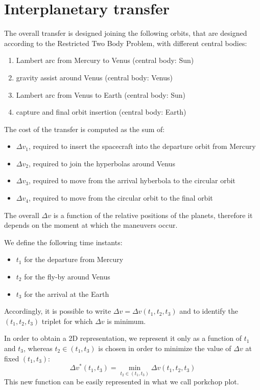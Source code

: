 \section{Interplanetary transfer}

The overall transfer is designed joining the following orbits,
that are designed according to the Restricted Two Body Problem,
with different central bodies:
\begin{enumerate}
	\item Lambert arc from Mercury to Venus (central body: Sun)
	\item gravity assist around Venus (central body: Venus)
	\item Lambert arc from Venus to Earth (central body: Sun)
	\item capture and final orbit insertion  (central body: Earth)
\end{enumerate}
The cost of the transfer is computed as the sum of:

\begin{itemize}
	\item $\Delta v_1$, required to insert the spacecraft into the departure orbit from Mercury
	\item $\Delta v_2$, required to join the hyperbolas around Venus
	\item $\Delta v_3$, required to move from the arrival hyberbola to the circular orbit
	\item $\Delta v_4$, required to move from the circular orbit to the final orbit
\end{itemize}
The overall $\Delta v$ is a function of the relative positions of the planets,
therefore it depends on the moment at which the maneuvers occur.

We define the following time instants:
\begin{itemize}
	\item $t_1$ for the departure from Mercury
	\item $t_2$ for the fly-by around Venus
	\item $t_3$ for the arrival at the Earth
\end{itemize}
Accordingly, it is possible to write $\Delta v=\Delta v(t_1,t_2,t_3)$ and to identify
the $(t_1,t_2,t_3)$ triplet for which $\Delta v$ is minimum.

In order to obtain a 2D representation,
we represent it only as a function of $t_1$ and $t_3$,
whereas $t_2 \in (t_1,t_3)$ is chosen in order to minimize the value of $\Delta v$ at fixed $(t_1,t_3)$:
$$\Delta v^*(t_1,t_3) = \min_{t_2 \in (t_1,t_3)} \Delta v(t_1,t_2,t_3)$$
This new function can be easily represented in what we call porkchop plot.

